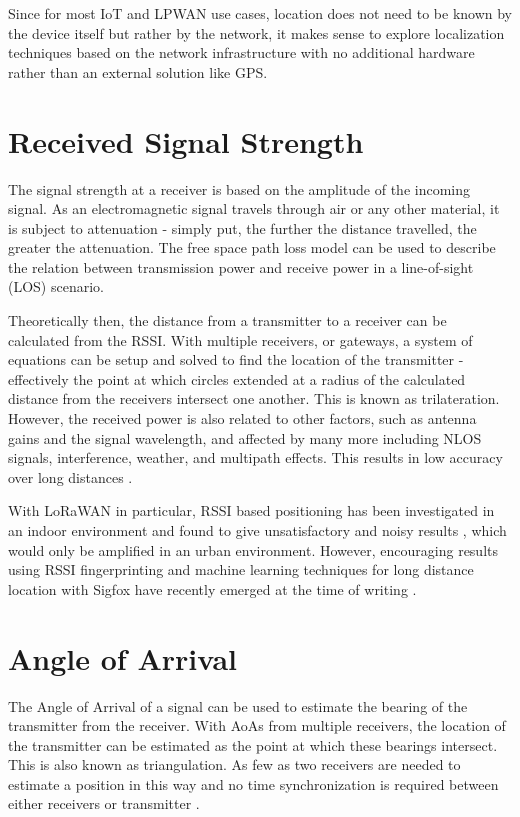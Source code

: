 \documentclass[a4paper]{report}
\begin{document}
    Since for most IoT and LPWAN use cases, location does not need to be known by the device itself but rather by the network, it makes sense to explore localization techniques based on the network infrastructure with no additional hardware rather than an external solution like GPS.

  \section{Received Signal Strength}
    The signal strength at a receiver is based on the amplitude of the incoming signal. As an electromagnetic signal travels through air or any other material, it is subject to attenuation - simply put, the further the distance travelled, the greater the attenuation. The free space path loss model can be used to describe the relation between transmission power and receive power in a line-of-sight (LOS) scenario.

    Theoretically then, the distance from a transmitter to a receiver can be calculated from the RSSI. With multiple receivers, or gateways, a system of equations can be setup and solved to find the location of the transmitter - effectively the point at which circles extended at a radius of the calculated distance from the receivers intersect one another. This is known as trilateration. However, the received power is also related to other factors, such as antenna gains and the signal wavelength, and affected by many more including NLOS signals, interference, weather, and multipath effects. This results in low accuracy over long distances \cite{Yang:2009}.

    With LoRaWAN in particular, RSSI based positioning has been investigated in an indoor environment and found to give unsatisfactory and noisy results \cite{Henriksson2016}, which would only be amplified in an urban environment. However, encouraging results using RSSI fingerprinting and machine learning techniques for long distance location with Sigfox have recently emerged at the time of writing \cite{Sallouha2017}.

  \section{Angle of Arrival}
    The Angle of Arrival of a signal can be used to estimate the bearing of the transmitter from the receiver. With AoAs from multiple receivers, the location of the transmitter can be estimated as the point at which these bearings intersect. This is also known as triangulation. As few as two receivers are needed to estimate a position in this way and no time synchronization is required between either receivers or transmitter \cite{Krizmant1997}.
\end{document}
